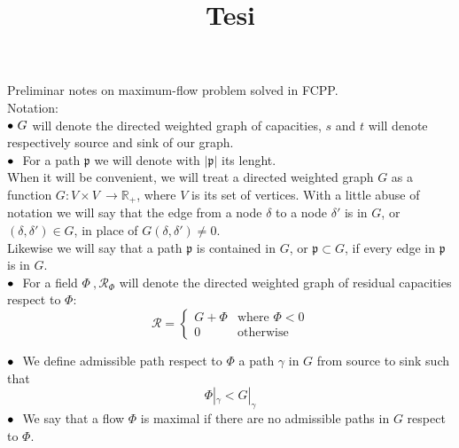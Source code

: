 \documentclass{article}
\title{Tesi}
\author{}
\date{}
\theoremstyle{plain}
\theoremstyle{definition}
\theoremstyle{remark}
\begin{document}
Preliminar notes on maximum-flow problem solved in FCPP.\\
Notation:\\
 $\small\bullet\ G$ will denote the directed weighted graph of capacities, 
 $s$ and $t$ will denote respectively source and sink of our graph.\\
 $\small\bullet\ $  For a path $\mathfrak{p}$ we will denote with $|\mathfrak{p}|$ its lenght.\\

When it will be convenient, we will treat a directed weighted graph $G$ as a function $G: V\times V\ \rightarrow \mathbb{R_{+}}$, where $V$ is its set of vertices. With a little abuse of notation we will say that the edge from a node $\delta$ to a node $\delta'$ is in $G$, or $(\delta, \delta') \in G$,  in place of $G(\delta, \delta') \not= 0$.\\
Likewise we will say that a path $\mathfrak{p}$ is contained in $G$, or $\mathfrak{p}\subset G$, if every edge in $\mathfrak{p}$ is in $G$.\\

 $\small\bullet\ $ For a field $\Phi\ , \mathcal{R}_{\Phi}$ will denote the directed weighted graph of residual capacities respect to $\Phi$:
\begin{equation}
\label{eq:residual-capacity}
\mathcal{R} =
\begin{cases}
    G+\Phi& \text{where } \Phi< 0\\
    0              & \text{otherwise}
\end{cases}
\end{equation}

$\small\bullet\ $  We define admissible path respect to $\Phi$  a path $\gamma$ in $G$ from source to sink such that 
\begin{equation*}
\Phi|_{\gamma} < G|_{\gamma}
\end{equation*}
$\small\bullet\ $ We say that a flow $\Phi$ is maximal if there are no admissible paths in $G$ respect to $\Phi$.
\end{document}
